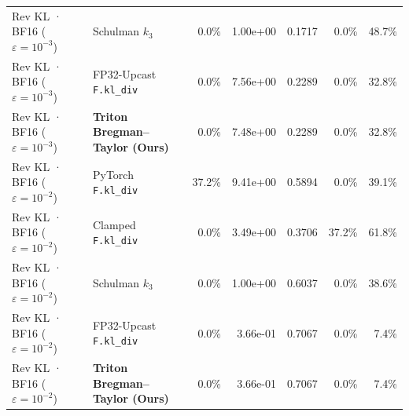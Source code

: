 \documentclass[10pt,twocolumn]{article}
\begin{document}
\begin{table}[t]
{\begin{tabular}{llrrrrr}
    Rev KL · BF16 ($\varepsilon=10^{-3}$) & Schulman $k_3$ & 0.0\% & 1.00e+00 & 0.1717 & 0.0\% & 48.7\% \\
    Rev KL · BF16 ($\varepsilon=10^{-3}$) & FP32-Upcast \texttt{F.kl\_div} & 0.0\% & 7.56e+00 & 0.2289 & 0.0\% & 32.8\% \\
    Rev KL · BF16 ($\varepsilon=10^{-3}$) & \textbf{Triton Bregman--Taylor (Ours)} & 0.0\% & 7.48e+00 & 0.2289 & 0.0\% & 32.8\% \\
    \midrule
    Rev KL · BF16 ($\varepsilon=10^{-2}$) & PyTorch \texttt{F.kl\_div} & 37.2\% & 9.41e+00 & 0.5894 & 0.0\% & 39.1\% \\
    Rev KL · BF16 ($\varepsilon=10^{-2}$) & Clamped \texttt{F.kl\_div} & 0.0\% & 3.49e+00 & 0.3706 & 37.2\% & 61.8\% \\
    Rev KL · BF16 ($\varepsilon=10^{-2}$) & Schulman $k_3$ & 0.0\% & 1.00e+00 & 0.6037 & 0.0\% & 38.6\% \\
    Rev KL · BF16 ($\varepsilon=10^{-2}$) & FP32-Upcast \texttt{F.kl\_div} & 0.0\% & 3.66e-01 & 0.7067 & 0.0\% & 7.4\% \\
    Rev KL · BF16 ($\varepsilon=10^{-2}$) & \textbf{Triton Bregman--Taylor (Ours)} & 0.0\% & 3.66e-01 & 0.7067 & 0.0\% & 7.4\% \\
    \bottomrule
  \end{tabular}}
\end{table}

\begin{table}[t]
  \centering
  \caption{RTX~5090 BF16 forward+backward latency (CUDA events, 20 runs) and peak extra VRAM vs.\ FP32-upcast, PyTorch~2.11 \texttt{torch.compile} (TorchInductor), and row-chunked FP32 (chunk=64).}
  \label{tab:kl_scaling}
  \scriptsize
\end{table}
\end{document}
